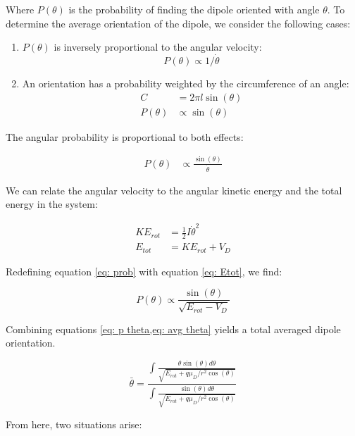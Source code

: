 Where $P(\theta)$ is the probability of finding the dipole oriented with angle $\theta$. To determine the average orientation of the dipole, we consider the following cases:

\begin{enumerate}
	\item $P(\theta)$ is inversely proportional to the angular velocity:
	\begin{equation*}
		P(\theta) \propto 1/\dot{\theta}
	\end{equation*}
	\item An orientation has a probability weighted by the circumference of an angle:
	\begin{align*}
		C & = 2\pi l \sin(\theta) \\
		P(\theta) & \propto \sin(\theta)
	\end{align*}
\end{enumerate}

The angular probability is proportional to both effects:

\begin{align}
    P(\theta) & \propto \frac{\sin(\theta)}{\dot{\theta}} \label{eq: prob}
\end{align}

We can relate the angular velocity to the angular kinetic energy and the total energy in the system:

\begin{align}
    KE_{rot} & = \frac{1}{2}I\dot{\theta}^2 \nonumber \\
    E_{tot} & = KE_{rot} + V_D \label{eq: Etot}
\end{align}

Redefining equation \ref{eq: prob} with equation \ref{eq: Etot}, we find:

\begin{equation}
    P(\theta) \propto \frac{\sin(\theta)}{\sqrt{E_{rot}-V_D}} \label{eq: p theta}
\end{equation}

Combining equations \cref{eq: p theta,eq: avg theta} yields a total averaged dipole orientation.

\begin{equation}
    \bar{\theta} = \frac{\int\frac{\theta \sin(\theta)d\theta}{\sqrt{E_{rot}+q\mu_D/r^2 \cos(\theta)}}}{\int\frac{\sin(\theta)d\theta}{\sqrt{E_{rot}+q\mu_D/r^2 \cos(\theta)}}} \label{eq: avg theta int}
\end{equation}

From here, two situations arise:

